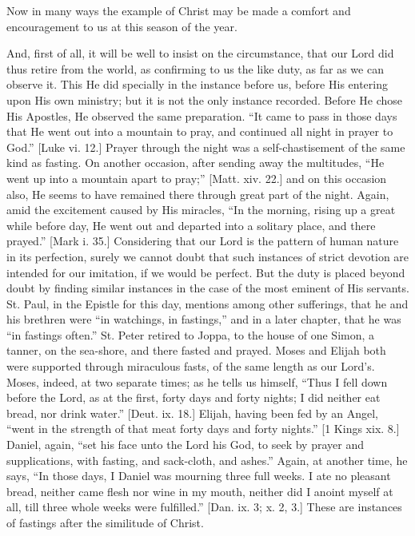 Now in many ways the example of Christ may be made a comfort and
encouragement to us at this season of the year.

And, first of all, it will be well to insist on the circumstance,
that our Lord did thus retire from the world, as confirming to us the
like duty, as far as we can observe it. This He did specially in the
instance before us, before His entering upon His own ministry; but it
is not the only instance recorded. Before He chose His Apostles, He
observed the same preparation. ``It came to pass in those days
that He went out into a mountain to pray, and continued all night in
prayer to God.'' [Luke vi. 12.] Prayer through the night was a
self-chastisement of the same kind as fasting. On another occasion,
after sending away the multitudes, ``He went up into a mountain
apart to pray;'' [Matt. xiv. 22.] and on this occasion also, He
seems to have remained there through great part of the night. Again,
amid the excitement caused by His miracles, ``In the morning,
rising up a great while before day, He went out and departed into a
solitary place, and there prayed.'' [Mark i. 35.] Considering that
our Lord is the pattern of human nature in its perfection, surely we
cannot doubt that such instances of strict devotion are intended for
our imitation, if we would be perfect. But the duty is placed beyond
doubt by finding similar instances in the case of the most eminent of
His servants. St. Paul, in the Epistle for this day, mentions among
other sufferings, that he and his brethren were ``in watchings, in
fastings,'' and in a later chapter, that he was ``in fastings
often.'' St. Peter retired to Joppa, to the house of one Simon, a
tanner, on the sea-shore, and there fasted and prayed. Moses and
Elijah both were supported through miraculous fasts, of the same
length as our Lord's. Moses, indeed, at two separate times; as he
tells us himself, ``Thus I fell down before the Lord, as at the
first, forty days and forty nights; I did neither eat bread, nor drink
water.'' [Deut. ix. 18.] Elijah, having been fed by an Angel,
``went in the strength of that meat forty days and forty
nights.'' [1 Kings xix. 8.] Daniel, again, ``set his face unto
the Lord his God, to seek by prayer and supplications, with fasting,
and sack-cloth, and ashes.'' Again, at another time, he says,
``In those days, I Daniel was mourning three full weeks. I ate no
pleasant bread, neither came flesh nor wine in my mouth, neither did I
anoint myself at all, till three whole weeks were fulfilled.''
[Dan. ix. 3; x. 2, 3.] These are instances of fastings after the
similitude of Christ.

